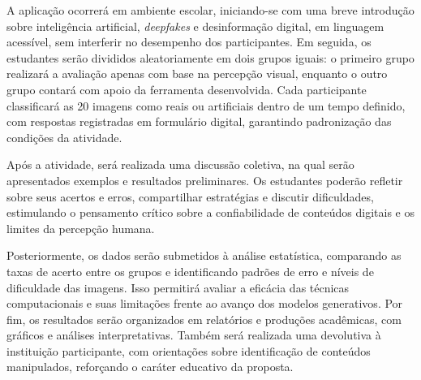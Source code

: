 A aplicação ocorrerá em ambiente escolar, iniciando-se com uma breve introdução
sobre inteligência artificial, \textit{deepfakes} e desinformação digital, em
linguagem acessível, sem interferir no desempenho dos participantes. Em seguida,
os estudantes serão divididos aleatoriamente em dois grupos iguais: o primeiro
grupo realizará a avaliação apenas com base na percepção visual, enquanto o outro
grupo contará com apoio da ferramenta desenvolvida. Cada participante
classificará as 20 imagens como reais ou artificiais dentro de um tempo definido,
com respostas registradas em formulário digital, garantindo padronização das
condições da atividade.

Após a atividade, será realizada uma discussão coletiva, na qual serão
apresentados exemplos e resultados preliminares. Os estudantes poderão refletir
sobre seus acertos e erros, compartilhar estratégias e discutir dificuldades,
estimulando o pensamento crítico sobre a confiabilidade de conteúdos digitais e
os limites da percepção humana.

Posteriormente, os dados serão submetidos à análise estatística, comparando as
taxas de acerto entre os grupos e identificando padrões de erro e níveis de
dificuldade das imagens. Isso permitirá avaliar a eficácia das técnicas
computacionais e suas limitações frente ao avanço dos modelos generativos. Por
fim, os resultados serão organizados em relatórios e produções acadêmicas, com
gráficos e análises interpretativas. Também será realizada uma devolutiva à
instituição participante, com orientações sobre identificação de conteúdos
manipulados, reforçando o caráter educativo da proposta.

